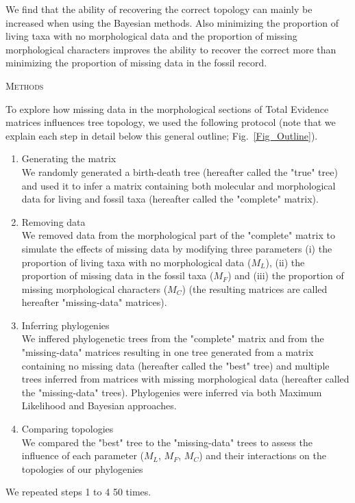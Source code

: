 \documentclass[12pt,letterpaper]{article}
\renewcommand{\section}[1]{%
\bigskip
\begin{center}
\begin{Large}
\normalfont\scshape #1
\medskip
\end{Large}
\end{center}}
\begin{document}
We find that the ability of recovering the correct topology can mainly be increased when using the Bayesian methods. Also minimizing the proportion of living taxa with no morphological data and the proportion of missing morphological characters improves the ability to recover the correct more than minimizing the proportion of missing data in the fossil record.

%
%
 
\newpage

\section{Methods}
To explore how missing data in the morphological sections of Total Evidence matrices influences tree topology, we used the following protocol (note that we explain each step in detail below this general outline; Fig.~\ref{Fig_Outline}).
\begin{enumerate}
\item{Generating the matrix} \label{step:generate_matrix} \\
We randomly generated a birth-death tree (hereafter called the "true" tree) and used it to infer a matrix containing both molecular and morphological data for living and fossil taxa (hereafter called the "complete" matrix).
\item{Removing data} \label{step:remove_data} \\
We removed data from the morphological part of the "complete" matrix to simulate the effects of missing data by modifying three parameters (i) the proportion of living taxa with no morphological data ($M_{L}$), (ii) the proportion of missing data in the fossil taxa ($M_{F}$) and (iii) the proportion of missing morphological characters ($M_{C}$) (the resulting matrices are called hereafter "missing-data" matrices).
\item{Inferring phylogenies} \label{step:build_phylo} \\
We inffered phylogenetic trees from the "complete" matrix and from the "missing-data" matrices resulting in one tree generated from a matrix containing no missing data (hereafter called the "best" tree) and multiple trees inferred from matrices with missing morphological data (hereafter called the "missing-data" trees). Phylogenies were inferred via both Maximum Likelihood and Bayesian approaches.
\item{Comparing topologies} \label{step:compare_topo} \\
We compared the "best" tree to the "missing-data" trees to assess the influence of each parameter ($M_{L}$, $M_{F}$, $M_{C}$) and their interactions on the topologies of our phylogenies
\end{enumerate}
We repeated steps 1 to 4 50 times.
\end{document}
